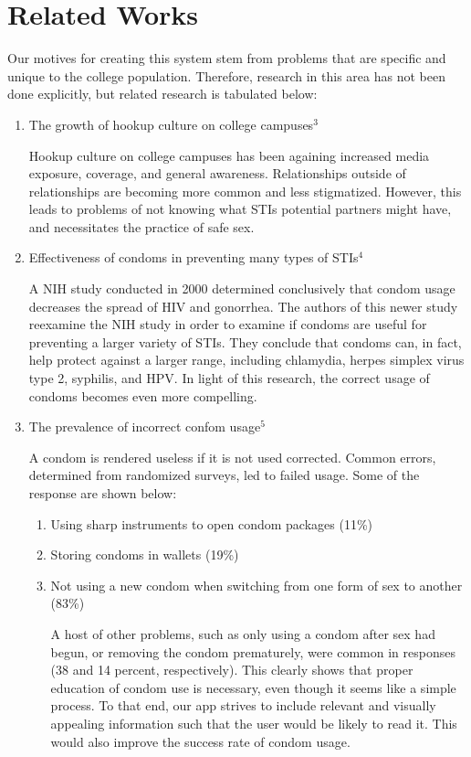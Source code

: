 \documentclass{acm_proc_article-sp}
\begin{document}
\section{Related Works}
\smallskip
Our motives for creating this system stem from problems that are specific and unique to the college population. Therefore, research in this area has not been done explicitly, but related research is tabulated below:
\begin{enumerate}
\item The growth of hookup culture on college campuses$^3$

Hookup culture on college campuses has been againing increased media exposure, coverage, and general awareness. Relationships outside of relationships are becoming more common and less stigmatized. However, this leads to problems of not knowing what STIs potential partners might have, and necessitates the practice of safe sex.

\item Effectiveness of condoms in preventing many types of STIs$^4$

A NIH study conducted in 2000 determined conclusively that condom usage decreases the spread of HIV and gonorrhea. The authors of this newer study reexamine the NIH study in order to examine if condoms are useful for preventing a larger variety of STIs. They conclude that condoms can, in fact, help protect against a larger range, including chlamydia, herpes simplex virus type 2, syphilis, and HPV. In light of this research, the correct usage of condoms becomes even more compelling.

\item The prevalence of incorrect confom usage$^5$

A condom is rendered useless if it is not used corrected. Common errors, determined from randomized surveys, led to failed usage. Some of the response are shown below:
\begin{enumerate}
\item Using sharp instruments to open condom packages (11\%)
\item Storing condoms in wallets (19\%)
\item Not using a new condom when switching from one form of sex to another (83\%)

A host of other problems, such as only using a condom after sex had begun, or removing the condom prematurely, were common in responses (38 and 14 percent, respectively). This clearly shows that proper education of condom use is necessary, even though it seems like a simple process. To that end, our app strives to include relevant and visually appealing information such that the user would be likely to read it. This would also improve the success rate of condom usage.
\end{enumerate}


\end{enumerate}
\end{document}
